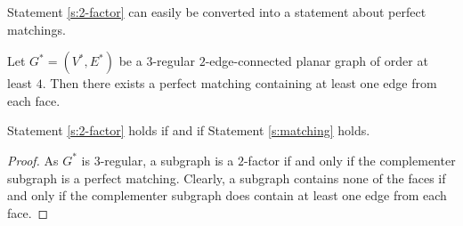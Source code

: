 Statement \ref{s:2-factor} can easily be converted into a statement about perfect matchings.

\begin{guess} \label{s:matching}
  Let $G^* = (V^*, E^*)$ be a $3$-regular $2$-edge-connected planar graph of order at least $4$.
  Then there exists a perfect matching containing at least one edge from each face.
\end{guess}
\begin{claim}
  Statement \ref{s:2-factor} holds if and if Statement \ref{s:matching} holds.
\end{claim}
\begin{proof}
  As $G^*$ is $3$-regular, a subgraph is a $2$-factor if and only if the complementer
  subgraph is a perfect matching. Clearly, a subgraph contains none of the faces
  if and only if the complementer subgraph does contain at least one edge from
  each face.
\end{proof}


